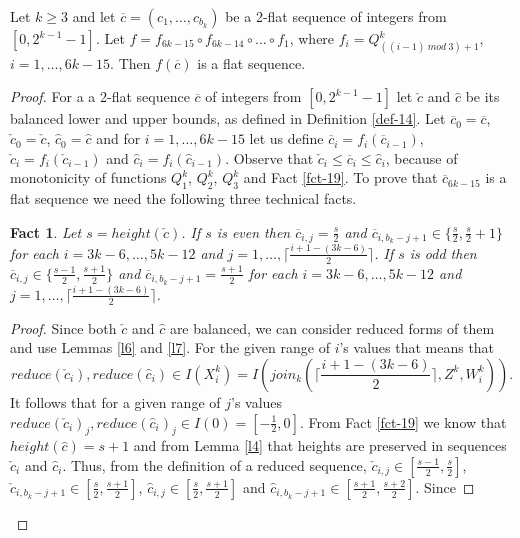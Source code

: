 \documentclass{llncs}
\newtheorem{fact}[theorem]{Fact}
\begin{document}
\begin{theorem}\label{thm-19}
Let $k\ge 3$ and let $\overline{c} = (c_1,\ldots,c_{b_k})$ be a 2-flat
sequence of integers from $[0,2^{k-1}-1]$. Let $f = f_{6k-15}\circ
f_{6k-14}\circ \ldots\circ f_1$, where $f_i = Q^k_{((i-1)~mod~3)+1}$,
$i=1,\ldots,6k-15$. Then $f(\overline{c})$ is a flat sequence.
\end{theorem}
\begin{proof}
For a a 2-flat sequence $\overline{c}$ of integers from $[0,2^{k-1}-1]$ let 
$\check{c}$ and $\hat{c}$ be its balanced lower and upper bounds, as defined 
in Definition \ref{def-14}. Let $\overline{c}_0 = \overline{c}$, $\check{c}_0 
= \check{c}$, $\hat{c}_0 = \hat{c}$ and for $i = 1,\ldots,6k-15$ let us 
define $\overline{c}_i = f_i(\overline{c}_{i-1})$, $\check{c}_i = 
f_i(\check{c}_{i-1})$ and $\hat{c}_i = f_i(\hat{c}_{i-1})$. Observe that 
$\check{c}_i\le \overline{c}_i\le \hat{c}_i$, because of monotonicity of 
functions $Q^k_1$, $Q^k_2$, $Q^k_3$ and Fact \ref{fct-19}. To prove that 
$\overline{c}_{6k-15}$ is a flat sequence we need the following three 
technical facts.
\begin{fact}\label{fct-21}
Let $s = height(\check{c})$. If $s$ is even then $\overline{c}_{i,j} =
\frac{s}{2}$ and $\overline{c}_{i,b_k-j+1}\in\{\frac{s}{2},\frac{s}{2}+1\}$
for each $i = 3k-6, \ldots, 5k-12$ and $j = 1, \ldots,
\lceil\frac{i+1-(3k-6)}{2}\rceil$. If $s$ is odd then  $\overline{c}_{i,j}
\in\{\frac{s-1}{2},\frac{s+1}{2}\}$ and $\overline{c}_{i,b_k-j+1} =
\frac{s+1}{2}$ for each $i = 3k-6, \ldots, 5k-12$ and $j = 1, \ldots,
\lceil\frac{i+1-(3k-6)}{2}\rceil$. 
\end{fact}
\begin{proof}
Since both $\check{c}$ and $\hat{c}$ are balanced, we can consider reduced 
forms of them and use Lemmas \ref{l6} and \ref{l7}. For the given range of 
$i$'s values that means that \[
reduce(\check{c}_i), reduce(\hat{c}_i) \in I(X^k_i) = 
I(join_k(\lceil\frac{i+1-(3k-6)}{2}\rceil,Z^k,W^k_i)).\]
It follows that for a given range of $j$'s values 
$reduce(\check{c}_i)_j, reduce(\hat{c}_i)_j \in I(0) = [-\frac{1}{2},0]$. 
From Fact \ref{fct-19} we know that $height(\hat{c}) = s+1$ and from Lemma 
\ref{l4} that heights are preserved in sequences $\check{c}_i$ and 
$\hat{c}_i$. Thus, from the definition of a reduced sequence, 
$\check{c}_{i,j} \in [\frac{s-1}{2},\frac{s}{2}]$, $\check{c}_{i,b_k-j+1} \in 
[\frac{s}{2},\frac{s+1}{2}]$, $\hat{c}_{i,j} \in [\frac{s}{2},\frac{s+1}{2}]$
and $\hat{c}_{i,b_k-j+1} \in [\frac{s+1}{2},\frac{s+2}{2}]$. Since 

\end{proof}
\end{proof}
\end{document}

